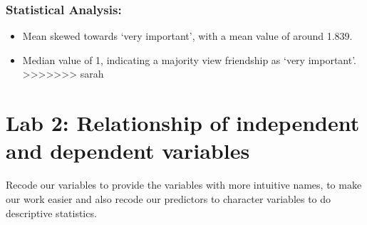 \documentclass[
]{article}
\providecommand{\tightlist}{%
  \setlength{\itemsep}{0pt}\setlength{\parskip}{0pt}}
\begin{document}
\hypertarget{statistical-analysis-5}{%
\subsubsection{Statistical Analysis:}\label{statistical-analysis-5}}

\begin{itemize}
\tightlist
\item
  Mean skewed towards `very important', with a mean value of around
  1.839.
\item
  Median value of 1, indicating a majority view friendship as `very
  important'.
  \textgreater\textgreater\textgreater\textgreater\textgreater\textgreater\textgreater{}
  sarah
\end{itemize}

\hypertarget{lab-2-relationship-of-independent-and-dependent-variables}{%
\section{Lab 2: Relationship of independent and dependent
variables}\label{lab-2-relationship-of-independent-and-dependent-variables}}

Recode our variables to provide the variables with more intuitive names,
to make our work easier and also recode our predictors to character
variables to do descriptive statistics.
\end{document}
